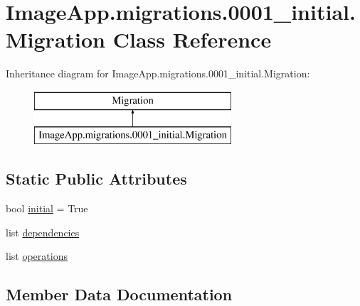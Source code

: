 \hypertarget{class_image_app_1_1migrations_1_10001__initial_1_1_migration}{}\section{Image\+App.\+migrations.0001\+\_\+initial.Migration Class Reference}
\label{class_image_app_1_1migrations_1_10001__initial_1_1_migration}
Inheritance diagram for Image\+App.\+migrations.0001\+\_\+initial.Migration\+:\begin{figure}[H]
\begin{center}
\leavevmode
\includegraphics[height=2.000000cm]{class_image_app_1_1migrations_1_10001__initial_1_1_migration}
\end{center}
\end{figure}
\subsection*{Static Public Attributes}
\begin{DoxyCompactItemize}
\item 
bool \mbox{\hyperlink{class_image_app_1_1migrations_1_10001__initial_1_1_migration_ab7c1550e482a827afc880d61aef3d582}{initial}} = True
\item 
list \mbox{\hyperlink{class_image_app_1_1migrations_1_10001__initial_1_1_migration_a0948ef2c2b5eecf68e435d8cf3891757}{dependencies}}
\item 
list \mbox{\hyperlink{class_image_app_1_1migrations_1_10001__initial_1_1_migration_a3e24a94fd90e7788a2bddffc7a529b16}{operations}}
\end{DoxyCompactItemize}


\subsection{Member Data Documentation}
\mbox{\label{class_image_app_1_1migrations_1_10001__initial_1_1_migration_a0948ef2c2b5eecf68e435d8cf3891757}} 
